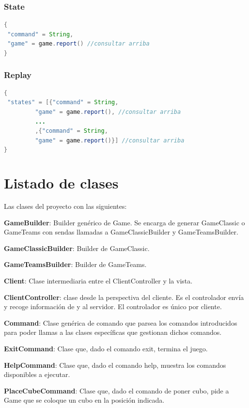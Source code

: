 \documentclass[../DocumentoOficial.tex]{subfiles}
\begin{document}
\newpage

\subsection*{State}
\begin{lstlisting}[frame=single, language=Java]
{
 "command" = String,
 "game" = game.report() //consultar arriba
}
\end{lstlisting}

\subsection*{Replay}
\begin{lstlisting}[frame=single, language=Java]
{
 "states" = [{"command" = String,
 	     "game" = game.report(), //consultar arriba
 	     ...
 	     ,{"command" = String,
 	     "game" = game.report()}] //consultar arriba
}
\end{lstlisting}

\chapter{Listado de clases}

Las clases del proyecto con las siguientes:

\textbf{GameBuilder}: Builder genérico de Game. Se encarga de generar GameClassic o GameTeams con sendas llamadas a GameClassicBuilder y GameTeamsBuilder.

\textbf{GameClassicBuilder}: Builder de GameClassic.

\textbf{GameTeamsBuilder}: Builder de GameTeams.

\textbf{Client}: Clase intermediaria entre el ClientController y la vista.

\textbf{ClientController}: clase desde la perspectiva del cliente. Es el controlador envía y recoge información de y al servidor. El controlador es único por cliente.

\textbf{Command}: Clase genérica de comando que parsea los comandos introducidos para poder llamas a las clases específicas que gestionan dichos comandos.

\textbf{ExitCommand}: Clase que, dado el comando exit, termina el juego.

\textbf{HelpCommand}: Clase que, dado el comando help, muestra los comandos disponibles a ejecutar.

\textbf{PlaceCubeCommand}: Clase que, dado el comando de poner cubo, pide a Game que se coloque un cubo en la posición indicada.
\end{document}
